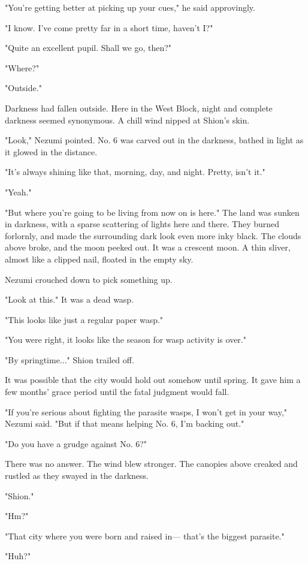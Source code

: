 "You're getting better at picking up your cues," he said approvingly.

"I know. I've come pretty far in a short time, haven't I?"

"Quite an excellent pupil. Shall we go, then?"

"Where?"

"Outside."

Darkness had fallen outside. Here in the West Block, night and complete
darkness seemed synonymous. A chill wind nipped at Shion's skin.

"Look," Nezumi pointed. No. 6 was carved out in the darkness, bathed in
light as it glowed in the distance.

"It's always shining like that, morning, day, and night. Pretty, isn't
it."

"Yeah."

"But where you're going to be living from now on is here." The land was
sunken in darkness, with a sparse scattering of lights here and there.
They burned forlornly, and made the surrounding dark look even more inky
black. The clouds above broke, and the moon peeked out. It was a
crescent moon. A thin sliver, almost like a clipped nail, floated in the
empty sky.

Nezumi crouched down to pick something up.

"Look at this." It was a dead wasp.

"This looks like just a regular paper wasp."

"You were right, it looks like the season for wasp activity is over."

"By springtime..." Shion trailed off.

It was possible that the city would hold out somehow until spring. It
gave him a few months' grace period until the fatal judgment would fall.

"If you're serious about fighting the parasite wasps, I won't get in
your way," Nezumi said. "But if that means helping No. 6, I'm backing
out."

"Do you have a grudge against No. 6?"

There was no answer. The wind blew stronger. The canopies above creaked
and rustled as they swayed in the darkness.

"Shion."

"Hm?"

"That city where you were born and raised in--- that's the biggest
parasite."

"Huh?"

